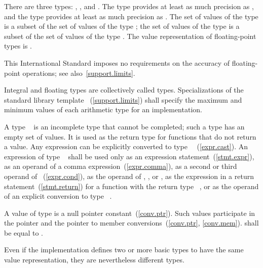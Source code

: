 \pnum
There are three  types:
%
,
%
,
and
%
. The type  provides at least as much
precision as , and the type  provides at
least as much precision as . The set of values of the type
 is a subset of the set of values of the type
; the set of values of the type  is a subset
of the set of values of the type . The value
representation of floating-point types is .
%
\begin{note}
This International Standard imposes no requirements on the accuracy of
floating-point operations; see also~\ref{support.limits}.
\end{note}
Integral and floating types are collectively
called  types.
%
Specializations of the standard library template
~(\ref{support.limits}) shall specify the
maximum and minimum values of each arithmetic type for an
implementation.

\pnum
{}%
A type \cv{}~
is an incomplete type that cannot be completed; such a type has
an empty set of values. It is used as the return
type for functions that do not return a value. Any expression can be
explicitly converted to type \cv{}~~(\ref{expr.cast}).
An expression of type \cv{}~ shall
be used only as an expression statement~(\ref{stmt.expr}), as an operand
of a comma expression~(\ref{expr.comma}), as a second or third operand
of ~(\ref{expr.cond}), as the operand of
, , or , as
the expression in a return statement~(\ref{stmt.return}) for a function
with the return type \cv{}~, or as the operand of an explicit conversion
to type \cv{}~.

\pnum
A value of type  is a null pointer
constant~(\ref{conv.ptr}). Such values participate in the pointer and the
pointer to member conversions~(\ref{conv.ptr}, \ref{conv.mem}).
 shall be equal to .

\pnum
\begin{note}
Even if the implementation defines two or more basic types to have the
same value representation, they are nevertheless different types.
\end{note}

